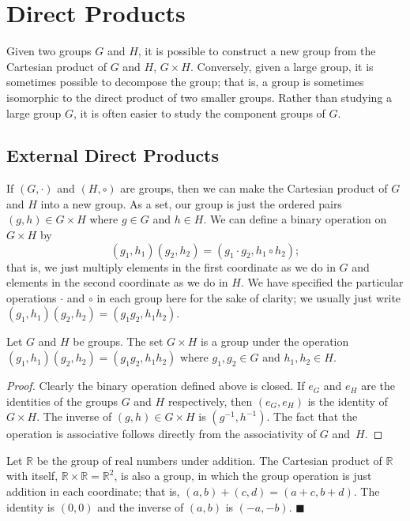 \section{Direct Products}\label{isomorph_section_2}

Given two groups $G$ and $H$, it is possible to construct a new group from the Cartesian product of $G$ and $H$, $G \times H$.  Conversely, given a large group, it is sometimes possible to decompose the group; that is, a group is sometimes isomorphic to the direct product of two smaller groups.  Rather than studying a large group $G$, it is often easier to study the component groups of $G$. 
 
 
\subsection*{External Direct Products}

If $(G,\cdot)$ and $(H, \circ)$ are groups, then we can make the Cartesian product of $G$ and $H$ into a new group.  As a set, our group is just the ordered pairs $(g, h) \in G \times H$ where $g \in G$ and $h \in H$. We can define a binary operation on $G \times H$ by 
$$
(g_1, h_1)(g_2, h_2) = (g_1 \cdot g_2, h_1 \circ h_2);
$$
that is, we just multiply elements in the first coordinate as we do in $G$ and elements in the second coordinate as we do in $H$.  We have specified the particular operations $\cdot$ and $\circ$ in each group here for the sake of clarity; we usually just write $(g_1, h_1)(g_2, h_2) = (g_1  g_2, h_1 h_2)$.  

\begin{proposition}\label{isomorph_theorem_7}
Let $G$ and $H$ be groups. The set $G \times H$ is a group under the operation $(g_1, h_1)(g_2, h_2) = (g_1  g_2, h_1 h_2)$ where $g_1, g_2 \in G$ and $h_1, h_2 \in H$. 
\end{proposition}

\begin{proof}
Clearly the binary operation defined above is closed. If $e_G$ and $e_H$ are the identities of the groups $G$ and $H$ respectively, then $(e_G, e_H)$ is the identity of $G \times H$.  The inverse of $(g, h) \in G \times H$ is $(g^{-1}, h^{-1})$.  The fact that the operation is associative follows directly from the associativity of $G$ and~$H$.
\end{proof}

\medskip

Let ${\mathbb R}$ be the group of real numbers under addition.  The Cartesian product of ${\mathbb R}$ with itself, ${\mathbb R} \times {\mathbb R} = {\mathbb R}^2$, is also a group, in which the group operation is just addition in each coordinate; that is, $(a, b) + (c, d) = (a + c, b + d)$.  The identity is $(0,0)$ and the inverse of $(a, b)$ is $(-a, -b)$.
\hspace{\fill} $\blacksquare$

